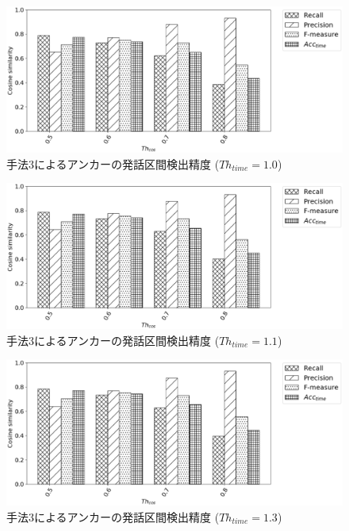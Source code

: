 \begin{figure}[H]
  \begin{center}
    \includegraphics[scale=0.5]{./figure/prob3_10.eps}
  \end{center}
  \caption{手法3によるアンカーの発話区間検出精度 ($Th_{time}=1.0$)}
\end{figure}

\begin{figure}[H]
  \begin{center}
    \includegraphics[scale=0.5]{./figure/prob3_11.eps}
  \end{center}
  \caption{手法3によるアンカーの発話区間検出精度 ($Th_{time}=1.1$)}
\end{figure}

\begin{figure}[H]
  \begin{center}
    \includegraphics[scale=0.5]{./figure/prob3_12.eps}
  \end{center}
  \caption{手法3によるアンカーの発話区間検出精度 ($Th_{time}=1.3$)}
\end{figure}

